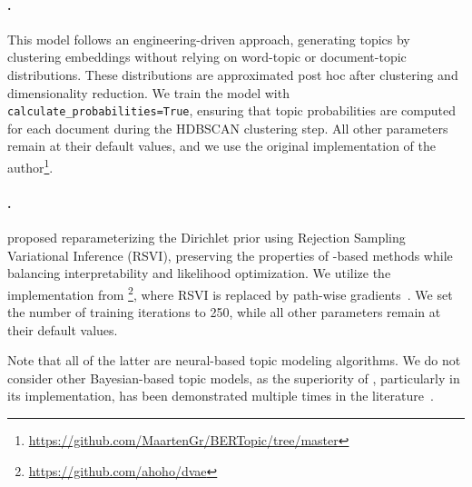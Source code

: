 \paragraph{\bertopic{}.} This model follows an engineering-driven approach, generating topics by clustering  embeddings without relying on word-topic or document-topic distributions. These distributions are approximated post hoc after clustering and dimensionality reduction. We train the model with \texttt{calculate\_probabilities=True}, ensuring that topic probabilities are computed for each document during the HDBSCAN clustering step. All other parameters remain at their default values, and we use the original implementation of the author\footnote{\url{https://github.com/MaartenGr/BERTopic/tree/master}}.

\paragraph{\dvae{}.} \citet{burkhardt2019decoupling} proposed reparameterizing the Dirichlet prior using Rejection Sampling Variational Inference (RSVI), preserving the properties of \lda{}-based methods while balancing interpretability and likelihood optimization. We utilize the implementation from \citet{hoyle2021automated}\footnote{\url{https://github.com/ahoho/dvae}}, where RSVI is replaced by path-wise gradients~\cite{jankowiak2018pathwise}. We set the number of training iterations to 250, while all other parameters remain at their default values.

Note that all of the latter are neural-based topic modeling algorithms. We do not consider other Bayesian-based topic models, as the superiority of \lda{}, particularly in its \mallet{} implementation, has been demonstrated multiple times in the literature~\cite{hoyle-21,doogan-buntine-2021-topic, an2023sodapopopenendeddiscoverysocial, liu2024understandingincontextlearningcontrastive}.
%

%
%
%

